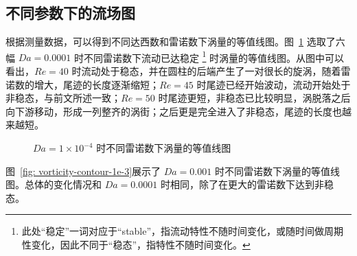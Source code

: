 \subsection{不同参数下的流场图}

根据测量数据，可以得到不同达西数和雷诺数下涡量的等值线图。图~\ref{fig: vorticity-contour-1e-4} 选取了六幅 $Da=0.0001$ 时不同雷诺数下流动已达稳定 \footnote{此处“稳定”一词对应于“stable”，指流动特性不随时间变化，或随时间做周期性变化，因此不同于“稳态”，指特性不随时间变化。} 时涡量的等值线图。从图中可以看出，$Re=40$ 时流动处于稳态，并在圆柱的后端产生了一对很长的旋涡，随着雷诺数的增大，尾迹的长度逐渐缩短；$Re=45$ 时尾迹已经开始波动，流动开始处于非稳态，与前文所述一致；$Re=50$ 时尾迹更短，非稳态已比较明显，涡脱落之后向下游移动，形成一列整齐的涡街；之后更是完全进入了非稳态，尾迹的长度也越来越短。


\begin{figure}
	\centering
	\begin{minipage}{\textwidth}
		\centering
	\end{minipage}
	\centering
	\begin{minipage}{\textwidth}
		\centering
	\end{minipage}
	\centering
	\begin{minipage}{\textwidth}
		\centering
	\end{minipage}
	\caption{$Da=1\times 10^{-4}$ 时不同雷诺数下涡量的等值线图}
	\label{fig: vorticity-contour-1e-4}
\end{figure}

图~\ref{fig: vorticity-contour-1e-3}展示了 $Da=0.001$ 时不同雷诺数下涡量的等值线图。总体的变化情况和 $Da=0.0001$ 时相同，除了在更大的雷诺数下达到非稳态。

